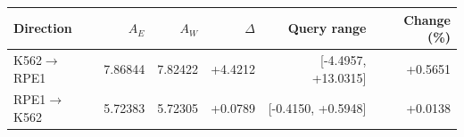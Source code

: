 \begin{tabular}{lrrrrr}
\toprule
Direction & $A_E$ & $A_W$ & $\Delta$ & Query range & Change (\%) \\
\midrule
K562$\to$RPE1 & 7.86844 & 7.82422 & +4.4212 & [-4.4957, +13.0315] & +0.5651 \\
RPE1$\to$K562 & 5.72383 & 5.72305 & +0.0789 & [-0.4150, +0.5948] & +0.0138 \\
\bottomrule
\end{tabular}

